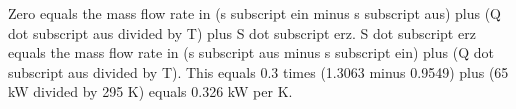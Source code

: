 Zero equals the mass flow rate in (s subscript ein minus s subscript aus) plus (Q dot subscript aus divided by T) plus S dot subscript erz. S dot subscript erz equals the mass flow rate in (s subscript aus minus s subscript ein) plus (Q dot subscript aus divided by T). This equals 0.3 times (1.3063 minus 0.9549) plus (65 kW divided by 295 K) equals 0.326 kW per K.